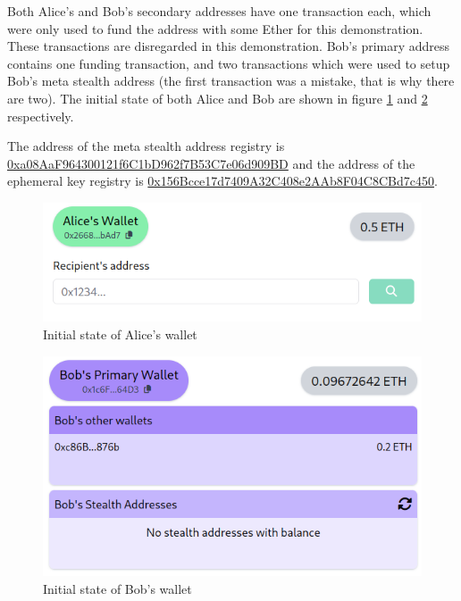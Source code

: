 Both Alice's and Bob's secondary addresses have one transaction each, which were
only used to fund the address with some Ether for this demonstration.
These transactions are disregarded in this demonstration.
Bob's primary address contains one funding transaction, and two transactions
which were used to setup Bob's meta stealth address (the first transaction was
a mistake, that is why there are two). The initial state of both Alice and Bob
are shown in figure \ref{fig:alice-initial} and \ref{fig:bob-initial} respectively.

The address of the meta stealth address registry is\\
\href{https://sepolia.etherscan.io/address/0xa08aaf964300121f6c1bd962f7b53c7e06d909bd#code}{0xa08AaF964300121f6C1bD962f7B53C7e06d909BD}
and the address of the ephemeral key registry is
\href{https://sepolia.etherscan.io/address/0x156bcce17d7409a32c408e2aab8f04c8cbd7c450}{0x156Bcce17d7409A32C408e2AAb8F04C8CBd7c450}.

\begin{figure}[h!]
    \centering
    \includegraphics[width=\textwidth]{assets/images/demo/alice-initial.png}
    \caption{Initial state of Alice's wallet}
    \label{fig:alice-initial}
\end{figure}

\begin{figure}[h!]
    \centering
    \includegraphics[width=\textwidth]{assets/images/demo/bob-initial.png}
    \caption{Initial state of Bob's wallet}
    \label{fig:bob-initial}
\end{figure}

